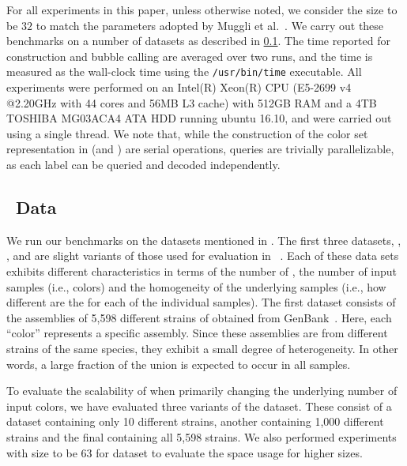 For all experiments in this paper, unless otherwise noted, we consider the \kmer
size to be $32$ to match the parameters adopted by Muggli et
al.~\cite{MuggliBoNo17}. We carry out these benchmarks on a number of datasets
as described in \cref{subsec:data}. The time reported for construction and
bubble calling are averaged over two runs, and the time is measured as the
wall-clock time using the \texttt{/usr/bin/time} executable. All experiments
were performed on an Intel(R) Xeon(R) CPU (E5-2699 v4 @2.20GHz with 44 cores and
56MB L3 cache) with 512GB RAM and a 4TB TOSHIBA MG03ACA4 ATA HDD running ubuntu
16.10, and were carried out using a single thread. We note that, while the
construction of the color set representation in \rainbowfish (and \vari) are serial
operations, queries are trivially parallelizable, as each label can be queried
and decoded independently.

\subsection{~Data}
\label{subsec:data}

We run our benchmarks on the datasets mentioned in .
The first three datasets, 
\ecoli, \plant, and \beefsafety are slight variants of those used for
evaluation in \vari~\cite{MuggliBoNo17}. Each of these data sets exhibits
different characteristics in terms of the number of \kmers, the number of input
samples (i.e., colors) and the homogeneity of the underlying samples (i.e., how
different are the \dbg for each of the individual samples).
%
The first dataset consists of the assemblies of 5,598 different strains of
\ecoli obtained from GenBank~\cite{o2015reference}. Here, each ``color''
represents a specific \ecoli assembly. Since these assemblies are from
different strains of the same species, they exhibit a small degree of
heterogeneity. In other words, a large fraction of the union \dbg is expected
to occur in all samples.

To evaluate the scalability of \rainbowfish when primarily changing the underlying
number of input colors, we have evaluated three variants of the \ecoli dataset.
These consist of a dataset containing only 10 different strains, another
containing 1,000 different strains and the final containing all 5,598 strains.
We also performed experiments with \kmer size to be $63$ for 
dataset to evaluate the space usage for higher \kmer sizes.




